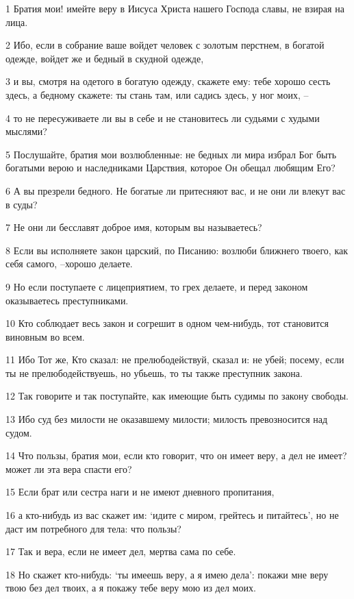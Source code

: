 \par 1 Братия мои! имейте веру в Иисуса Христа нашего Господа славы, не взирая на лица.
\par 2 Ибо, если в собрание ваше войдет человек с золотым перстнем, в богатой одежде, войдет же и бедный в скудной одежде,
\par 3 и вы, смотря на одетого в богатую одежду, скажете ему: тебе хорошо сесть здесь, а бедному скажете: ты стань там, или садись здесь, у ног моих, --
\par 4 то не пересуживаете ли вы в себе и не становитесь ли судьями с худыми мыслями?
\par 5 Послушайте, братия мои возлюбленные: не бедных ли мира избрал Бог быть богатыми верою и наследниками Царствия, которое Он обещал любящим Его?
\par 6 А вы презрели бедного. Не богатые ли притесняют вас, и не они ли влекут вас в суды?
\par 7 Не они ли бесславят доброе имя, которым вы называетесь?
\par 8 Если вы исполняете закон царский, по Писанию: возлюби ближнего твоего, как себя самого, --хорошо делаете.
\par 9 Но если поступаете с лицеприятием, то грех делаете, и перед законом оказываетесь преступниками.
\par 10 Кто соблюдает весь закон и согрешит в одном чем-нибудь, тот становится виновным во всем.
\par 11 Ибо Тот же, Кто сказал: не прелюбодействуй, сказал и: не убей; посему, если ты не прелюбодействуешь, но убьешь, то ты также преступник закона.
\par 12 Так говорите и так поступайте, как имеющие быть судимы по закону свободы.
\par 13 Ибо суд без милости не оказавшему милости; милость превозносится над судом.
\par 14 Что пользы, братия мои, если кто говорит, что он имеет веру, а дел не имеет? может ли эта вера спасти его?
\par 15 Если брат или сестра наги и не имеют дневного пропитания,
\par 16 а кто-нибудь из вас скажет им: `идите с миром, грейтесь и питайтесь', но не даст им потребного для тела: что пользы?
\par 17 Так и вера, если не имеет дел, мертва сама по себе.
\par 18 Но скажет кто-нибудь: `ты имеешь веру, а я имею дела': покажи мне веру твою без дел твоих, а я покажу тебе веру мою из дел моих.
